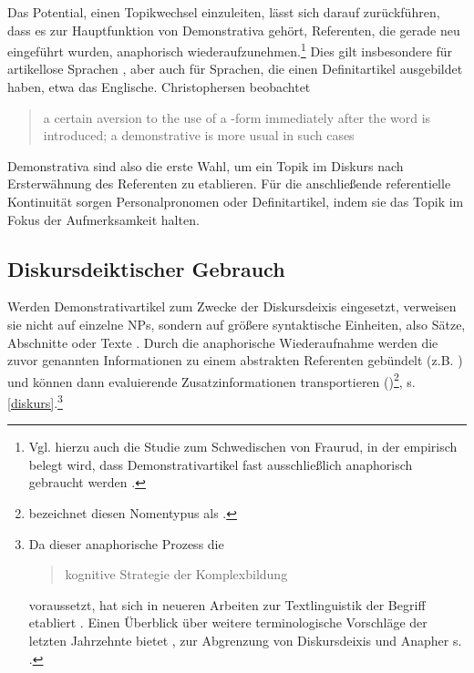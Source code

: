 \begin{exe}
	\ex \label{ex:topic}  
\end{exe}

Das Potential, einen Topikwechsel einzuleiten, lässt sich darauf zurückführen, dass es zur Hauptfunktion von Demonstrativa gehört, Referenten, die gerade neu eingeführt wurden, anaphorisch wiederaufzunehmen.\footnote{Vgl. hierzu auch die Studie zum Schwedischen von Fraurud, in der empirisch belegt wird, dass Demonstrativartikel fast ausschließlich anaphorisch gebraucht werden \parencite[400]{Fraurud1990}.} Dies gilt insbesondere für artikellose Sprachen  \parencite[229]{Himmelmann1996}, aber auch für Sprachen, die einen Definitartikel ausgebildet haben, etwa das Englische. Christophersen beobachtet \blockcquote[vgl.][29]{Christophersen1939} {a certain aversion to the use of a -form immediately after the word is introduced; a demonstrative is more usual in such cases}. Demonstrativa sind also die erste Wahl, um ein Topik im Diskurs nach Ersterwähnung des Referenten zu etablieren. Für die  anschließende referentielle Kontinuität sorgen  Personalpronomen oder Definitartikel, indem sie das Topik im Fokus der Aufmerksamkeit halten. 

\subsection{Diskursdeiktischer Gebrauch}\label{diskurs-deikt}

Werden Demonstrativartikel zum Zwecke der Diskursdeixis eingesetzt, verweisen sie nicht auf einzelne NPs, sondern auf größere syntaktische Einheiten, also Sätze, Abschnitte oder Texte \parencite{Webber1991,Fraurud1992, Fillmore1997, Diessel1999, Consten2007, Consten2009, Marx2011}. Durch die anaphorische Wiederaufnahme werden die zuvor genannten Informationen zu einem abstrakten Referenten gebündelt (z.B. ) und können dann evaluierende Zusatzinformationen transportieren ()\footnote{\textcite{Schmid2000} bezeichnet diesen Nomentypus als  .},  s. \ref{diskurs}.\footnote{Da dieser anaphorische Prozess die \blockcquote[129]{Schwarz2000}{kognitive Strategie der Komplexbildung} voraussetzt, hat sich in neueren Arbeiten zur Textlinguistik der Begriff  etabliert \parencite[s. z.b.][]{Consten2007, Consten2009}. Einen Überblick über weitere terminologische Vorschläge der letzten Jahrzehnte bietet \textcite[16-17]{Marx2011}, zur Abgrenzung von Diskursdeixis und Anapher s. \textcite[30-31]{Consten2004}.} 

